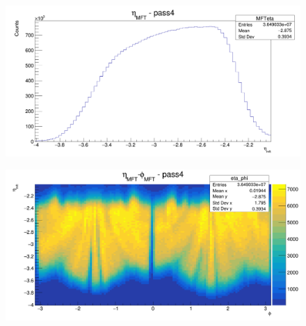 \documentclass[11pt]{beamer}
\begin{document}
\begin{frame}
\begin{columns}[c]
        \begin{column}{0.5\textwidth}
            \begin{figure}
                \begin{center}
                    \includegraphics[width=\textwidth]{Plots/MFT_pass4/eta.png}
                \end{center}
            \end{figure}
            \begin{figure}
                \begin{center}
                    \includegraphics[width=\textwidth]{Plots/MFT_pass4/eta-phi.png}
                \end{center}
            \end{figure}
        \end{column}
    \end{columns}

\end{frame}
\end{document}
